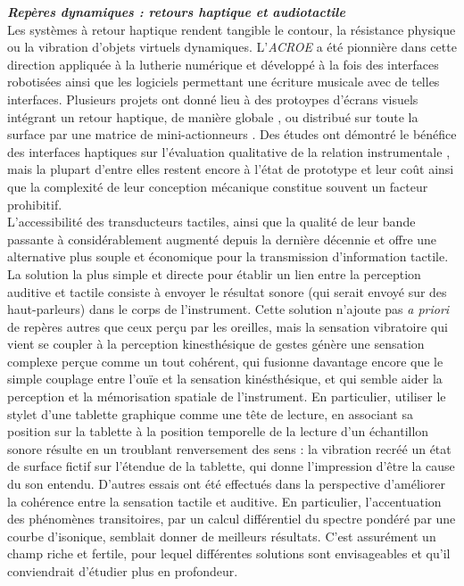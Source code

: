 \noindent\textbf{\textit{Repères dynamiques : retours haptique et audiotactile}}\\
\label{sec:audio-fretting}
\noindent Les systèmes à retour haptique rendent tangible le contour, la résistance physique ou la vibration d'objets virtuels dynamiques. L'\textit{ACROE} a été pionnière dans cette direction appliquée à la lutherie numérique et développé à la fois des interfaces robotisées ainsi que les logiciels permettant une écriture musicale avec de telles interfaces. Plusieurs projets ont donné lieu à des protoypes d'écrans visuels intégrant un retour haptique, de manière globale \cite{sinclair_touchmover_2013}, ou distribué sur toute la surface par une matrice de mini-actionneurs \cite{follmer_inform_2013}. Des études ont démontré le bénéfice des interfaces haptiques sur l'évaluation qualitative de la relation instrumentale \cite{omodhrain_playing_2001, young_qualitative_2017}, mais la plupart d'entre elles restent encore à l'état de prototype et leur coût ainsi que la complexité de leur conception mécanique constitue souvent un facteur prohibitif.\\
\indent L'accessibilité des transducteurs tactiles, ainsi que la qualité de leur bande passante à considérablement augmenté depuis la dernière décennie et offre une alternative plus souple et économique pour la transmission d'information tactile. La solution la plus simple et directe pour établir un lien entre la perception auditive et tactile consiste à envoyer le résultat sonore (qui serait envoyé sur des haut-parleurs) dans le corps de l'instrument. Cette solution n'ajoute pas \textit{a priori} de repères autres que ceux perçu par les oreilles, mais la sensation vibratoire qui vient se coupler à la perception kinesthésique de gestes génère une sensation complexe perçue comme un tout cohérent, qui fusionne davantage encore que le simple couplage entre l'ouïe et la sensation kinésthésique, et qui semble aider la perception et la mémorisation spatiale de l'instrument. En particulier, utiliser le stylet d'une tablette graphique comme une tête de lecture, en associant sa position sur la tablette à la position temporelle de la lecture d'un échantillon sonore résulte en un troublant renversement des sens : la vibration recréé un état de surface fictif sur l'étendue de la tablette, qui donne l'impression d'être la cause du son entendu. D'autres essais ont été effectués dans la perspective d'améliorer la cohérence entre la sensation tactile et auditive. En particulier, l'accentuation des phénomènes transitoires, par un calcul différentiel du spectre pondéré par une courbe d'isonique, semblait donner de meilleurs résultats. C'est assurément un champ riche et fertile, pour lequel différentes solutions sont envisageables et qu'il conviendrait d'étudier plus en profondeur.\\
